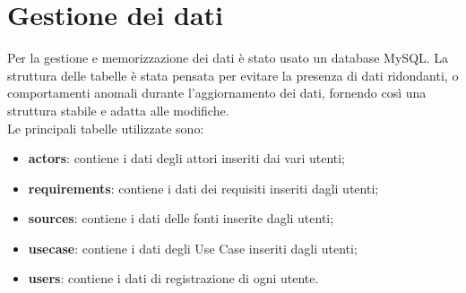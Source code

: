 \section{Gestione dei dati}
Per la gestione e memorizzazione dei dati è stato usato un database MySQL. La struttura delle tabelle è stata pensata per evitare la presenza di dati ridondanti, o comportamenti anomali durante l’aggiornamento dei dati, fornendo così una struttura stabile e adatta alle modifiche. \\
Le principali tabelle utilizzate sono:
\begin{itemize}
	\item \textbf{actors}: contiene i dati degli attori inseriti dai vari utenti;
	\item \textbf{requirements}: contiene i dati dei requisiti inseriti dagli utenti;
	\item \textbf{sources}: contiene i dati delle fonti inserite dagli utenti;
	\item \textbf{usecase}: contiene i dati degli Use Case inseriti dagli utenti;
	\item \textbf{users}: contiene i dati di registrazione di ogni utente.
\end{itemize}  